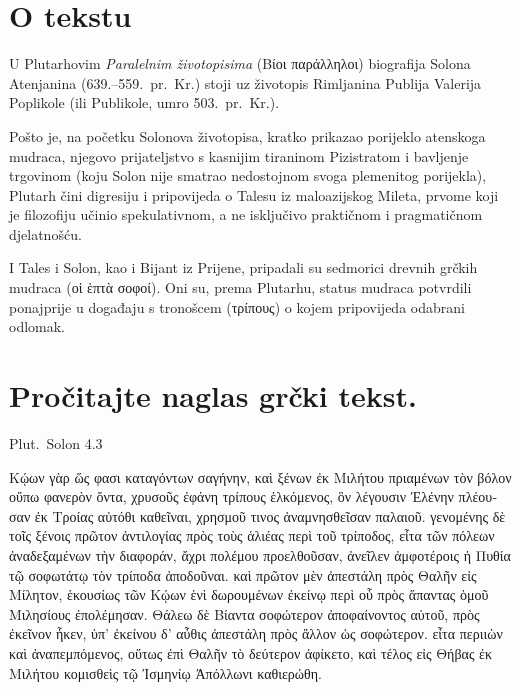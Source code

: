


\section*{O tekstu}

U Plutarhovim \textit{Paralelnim životopisima} \textgreek[variant=ancient]{(Βίοι παράλληλοι)} biografija Solona Atenjanina (639.–559.\ pr.~Kr.) stoji uz životopis Rimljanina Publija Valerija Poplikole (ili Publikole, umro 503.\ pr.~Kr.).

Pošto je, na početku Solonova životopisa, kratko prikazao porijeklo atenskoga mudraca, njegovo prijateljstvo s kasnijim tiraninom Pizistratom i bavljenje trgovinom (koju Solon nije smatrao nedostojnom svoga plemenitog porijekla), Plutarh čini digresiju i pripovijeda o Talesu iz maloazijskog Mileta, prvome koji je filozofiju učinio spekulativnom, a ne isključivo praktičnom i pragmatičnom djelatnošću. 

I Tales i Solon, kao i Bijant iz Prijene, pripadali su sedmorici drevnih grčkih mudraca \textgreek[variant=ancient]{(οἱ ἑπτὰ σοφοί).} Oni su, prema Plutarhu, status mudraca potvrdili ponajprije u događaju s tronošcem \textgreek[variant=ancient]{(τρίπους)} o kojem pripovijeda odabrani odlomak.


\section*{Pročitajte naglas grčki tekst.}

Plut.\ Solon 4.3

\medskip

{\large
\begin{greek}
\noindent Κῴων γὰρ ὥς φασι καταγόντων σαγήνην, καὶ ξένων ἐκ Μιλήτου πριαμένων τὸν βόλον οὔπω φανερὸν ὄντα, χρυσοῦς ἐφάνη τρίπους ἑλκόμενος, ὃν λέγουσιν Ἐλένην πλέουσαν ἐκ Τροίας αὐτόθι καθεῖναι, χρησμοῦ τινος ἀναμνησθεῖσαν παλαιοῦ. γενομένης δὲ τοῖς ξένοις πρῶτον ἀντιλογίας πρὸς τοὺς ἁλιέας περὶ τοῦ τρίποδος, εἶτα τῶν πόλεων ἀναδεξαμένων τὴν διαφοράν, ἄχρι πολέμου προελθοῦσαν, ἀνεῖλεν ἀμφοτέροις ἡ Πυθία τῷ σοφωτάτῳ τὸν τρίποδα ἀποδοῦναι. καὶ πρῶτον μὲν ἀπεστάλη πρὸς Θαλῆν εἰς Μίλητον, ἑκουσίως τῶν Κῴων ἑνὶ δωρουμένων ἐκείνῳ περὶ οὗ πρὸς ἅπαντας ὁμοῦ Μιλησίους ἐπολέμησαν. Θάλεω δὲ Βίαντα σοφώτερον ἀποφαίνοντος αὑτοῦ, πρὸς ἐκεῖνον ἧκεν, ὑπ' ἐκείνου δ' αὖθις ἀπεστάλη πρὸς ἄλλον ὡς σοφώτερον. εἶτα περιιὼν καὶ ἀναπεμπόμενος, οὕτως ἐπὶ Θαλῆν τὸ δεύτερον ἀφίκετο, καὶ τέλος εἰς Θήβας ἐκ Μιλήτου κομισθεὶς τῷ Ἰσμηνίῳ Ἀπόλλωνι καθιερώθη.
\end{greek}

}

